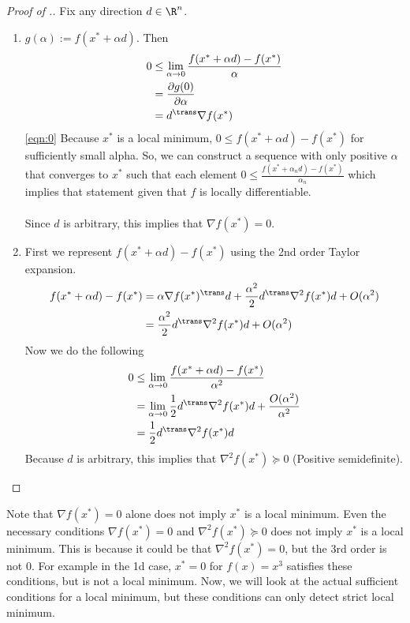 \begin{proof}[Proof of .]
Fix any direction $d \in \R^n$.
\begin{enumerate}
    \item $g(\alpha) := f(x^* + \alpha d)$. Then
    \begin{align}
        0 &\le \lim_{\alpha \to 0} \frac{f(x^* + \alpha d) - f(x^*)}{\alpha} \label{eqn:0} \\
        &= \frac{\partial g(0)}{\partial \alpha} \nonumber \\
        &= d^\trans \nabla f(x^*) \nonumber
    \end{align}
    \ref{eqn:0} Because $x^*$ is a local minimum, $0 \le f(x^* + \alpha d) - f(x^*)$ for sufficiently small alpha. So, we can construct a sequence with only positive $\alpha$ that converges to $x^*$ such that each element $0 \le \frac{f(x^* + \alpha_n d) - f(x^*)}{\alpha_n}$ which implies that statement given that $f$ is locally differentiable.\\
    \\
    Since $d$ is arbitrary, this implies that $\nabla f(x^*) = 0$.
    \item First we represent $f(x^* + \alpha d) - f(x^*)$ using the 2nd order Taylor expansion.
    \begin{align*}
        f(x^* + \alpha d) - f(x^*) &= \alpha \nabla f(x^*)^\trans d + \frac{\alpha^2}{2}d^\trans \nabla^2 f(x^*)d + O(\alpha^2) \nonumber\\
        &= \frac{\alpha^2}{2} d^\trans \nabla^2 f(x^*) d + O(\alpha^2) \\
    \end{align*}
    Now we do the following
    \begin{align*}
        0 &\le \lim_{\alpha \to 0} \frac{f(x^* + \alpha d) - f(x^*)}{\alpha^2} \\
        &= \lim_{\alpha \to 0} \frac{1}{2}d^\trans \nabla^2 f(x^*) d + \frac{O(\alpha^2)}{\alpha^2} \\
        &= \frac{1}{2}d^\trans \nabla^2 f(x^*) d
    \end{align*}
    Because $d$ is arbitrary, this implies that $\nabla^2 f(x^*) \succeq 0$ (Positive semidefinite).
    
\end{enumerate}
\end{proof}

Note that $\nabla f(x^*) = 0$ alone does not imply $x^*$ is a local minimum. Even the necessary conditions $\nabla f(x^*) = 0$ and $\nabla^2 f(x^*) \succeq 0$ does not imply $x^*$ is a local minimum. This is because it could be that $\nabla^2 f(x^*) = 0$, but the 3rd order is not 0. For example in the 1d case, $x^* = 0$ for $f(x) = x^3$ satisfies these conditions, but is not a local minimum. Now, we will look at the actual sufficient conditions for a local minimum, but these conditions can only detect strict local minimum.

